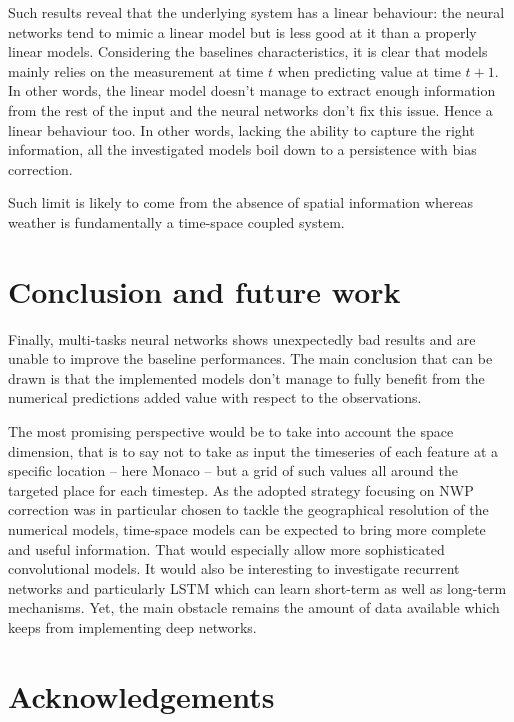 \documentclass{article}
\newcommand{\saut}{\vspace{10px}}
\begin{document}
Such results reveal that the underlying system has a linear behaviour: the neural networks tend to mimic
a linear model but is less good at it than a properly linear models. Considering the baselines characteristics,
it is clear that models mainly relies on the measurement at time $t$ when predicting value at time $t + 1$. In other
words, the linear model doesn't manage to extract enough information from the rest of the input and the neural
networks don't fix this issue. Hence a linear behaviour too. In other words, lacking the ability to capture the
right information, all the investigated models boil down to a persistence with bias correction.

\saut

Such limit is likely to come from the absence of spatial information whereas weather is fundamentally
a time-space coupled system.

\section*{Conclusion and future work}

Finally, multi-tasks neural networks shows unexpectedly bad results and are unable to improve the baseline
performances. The main conclusion that can be drawn is that the implemented models don't manage to fully
benefit from the numerical predictions added value with respect to the observations.

\saut

The most promising perspective would be to take into account the space dimension, that is to say not to take as input
the timeseries of each feature at a specific location -- here Monaco -- but a grid of such values all around the
targeted place for each timestep.
As the adopted strategy focusing on NWP correction was in particular chosen to tackle the geographical resolution
of the numerical models, time-space models can be expected to bring more complete and useful information.
That would especially allow more sophisticated convolutional models.
It would also be interesting to investigate recurrent networks and particularly
LSTM which can learn short-term as well as long-term mechanisms. Yet, the main obstacle remains the amount of data
available which keeps from implementing deep networks.

\section*{Acknowledgements}



\end{document}
